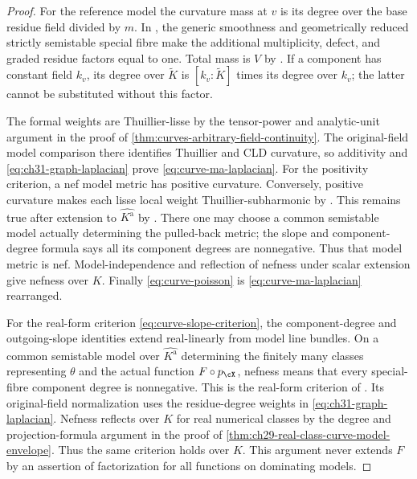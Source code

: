 \begin{proof}
For the reference model the curvature mass at \(v\) is its degree
over the base residue field divided by \(m\).
In \cite[Theorem~18.5.5 and Proposition~18.5.6(a)--(c)]{CLD25},
the generic smoothness and geometrically reduced strictly semistable
special fibre make the additional multiplicity, defect, and graded
residue factors equal to one.  Total mass is \(V\) by
\cite[Theorem~18.3.11]{CLD25}.
If a component has constant field \(k_v\), its degree over
\(\widetilde K\) is \([k_v:\widetilde K]\) times its degree over
\(k_v\); the latter cannot be substituted without this factor.

The formal weights are Thuillier-lisse by the tensor-power and
analytic-unit argument in the proof of
\cref{thm:curves-arbitrary-field-continuity}.
The original-field model comparison there identifies Thuillier and
CLD curvature, so additivity and \eqref{eq:ch31-graph-laplacian}
prove \eqref{eq:curve-ma-laplacian}.
For the positivity criterion, a nef model metric has positive
curvature.  Conversely, positive curvature makes each lisse local
weight Thuillier-subharmonic by \cite[Theorem~3.4.12(ii)]{Thu05}.
This remains true after extension to \(\widehat{K^{\mathrm a}}\)
by \cite[Corollary~3.4.5]{Thu05}.  There one may choose a common
semistable model actually determining the pulled-back metric; the
slope and component-degree formula
\cite[Proposition~3.7]{GJKM19} says all its component degrees are
nonnegative.  Thus that model metric is nef.
Model-independence and reflection of nefness under scalar extension
\cite[Proposition~3.5 and Lemma~3.3]{GM19} give nefness over \(K\).
Finally \eqref{eq:curve-poisson} is
\eqref{eq:curve-ma-laplacian} rearranged.

For the real-form criterion \eqref{eq:curve-slope-criterion},
the component-degree and outgoing-slope identities extend real-linearly
from model line bundles.  On a common semistable model over
\(\widehat{K^{\mathrm a}}\) determining the finitely many classes
representing \(\theta\) and the actual function \(F\circ p_{\cX}\),
nefness means that every special-fibre component degree is nonnegative.
This is the real-form criterion of \cite[Proposition~3.7]{GJKM19}.
Its original-field normalization uses the residue-degree weights
in \eqref{eq:ch31-graph-laplacian}.  Nefness reflects over \(K\)
for real numerical classes by the degree and projection-formula
argument in the proof of
\cref{thm:ch29-real-class-curve-model-envelope}.
Thus the same criterion holds over \(K\).
This argument never extends \(F\) by an assertion of factorization
for all functions on dominating models.
\end{proof}

